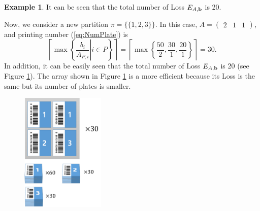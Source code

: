 \documentclass[a4paper]{amsart}
\numberwithin{equation}{section} %
\numberwithin{figure}{section} %
\numberwithin{table}{section}
\theoremstyle{plain}
\theoremstyle{definition}
\newtheorem{example}[thm]{Example}
\theoremstyle{plain}
\theoremstyle{plain}
\theoremstyle{plain}
\theoremstyle{plain}
\theoremstyle{plain}
\begin{document}
\begin{example}
	It can be seen that the total number of Loss $E_{A,{\bf b}}$ is 20.
	
	Now, we consider a new partition $\pi = \{\{1,2,3\}\}$. In this case, $A = (\begin{array}{ccc}2 & 1 & 1 \end{array})$, and printing number (\ref{eq:NumPlate}) is 
	\begin{equation}
	\left\lceil \max\left\{ \left. \frac{b_{i}}{A_{P,i}} \right| i \in P \right\} \right\rceil = \left\lceil \max \left\{ \frac{50}{2}, \frac{30}{1}, \frac{20}{1} \right\} \right\rceil = 30.
	\end{equation}
	In addition, it can be easily seen that the total number of Loss $E_{A,{\bf b}}$ is 20 (see Figure \ref{fig:ex12}).
	The array shown in Figure \ref{fig:ex12} is a more efficient because its Loss is the same but its number of plates is smaller.
	\begin{figure}[h!]
		\centering
		\includegraphics[width=4cm]{ex12.pdf}
		\caption{}
		\label{fig:ex12}       %
	\end{figure}
\end{example}
\end{document}
